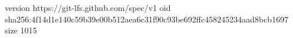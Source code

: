 version https://git-lfs.github.com/spec/v1
oid sha256:4f14d1e140c59b39e00b512aea6c31f90c93be692ffc458245234aad8bcb1697
size 1015

